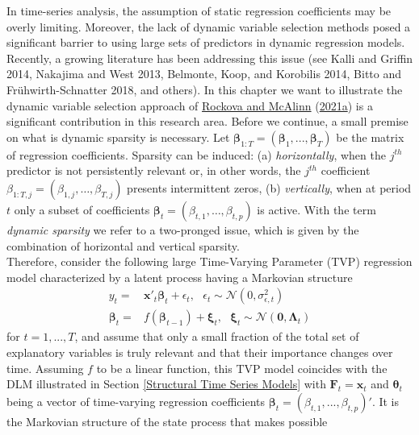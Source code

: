 \documentclass[
  12pt,
]{book}
\theoremstyle{break}
\theoremstyle{nonumberplain}
\begin{document}
In time-series analysis, the assumption of static regression
coefficients may be overly limiting. Moreover, the lack of dynamic
variable selection methods posed a significant barrier to using large
sets of predictors in dynamic regression models. Recently, a growing
literature has been addressing this issue (see Kalli and Griffin 2014,
Nakajima and West 2013, Belmonte, Koop, and Korobilis 2014, Bitto and
Frühwirth-Schnatter 2018, and others). In this chapter we want to
illustrate the dynamic variable selection approach of
\protect\hyperlink{ref-rockova_mcalinn_2021}{Rockova and McAlinn}
(\protect\hyperlink{ref-rockova_mcalinn_2021}{2021a}) is a significant
contribution in this research area. Before we continue, a small premise
on what is dynamic sparsity is necessary. Let
\(\boldsymbol{\beta}_{1:T}=(\boldsymbol{\beta}_{1},...,\boldsymbol{\beta}_{T})\)
be the matrix of regression coefficients. Sparsity can be induced: (a)
\emph{horizontally}, when the \(j^{th}\) predictor is not persistently
relevant or, in other words, the \(j^{th}\) coefficient
\(\beta_{1:T, j}=(\beta_{1,j}, \ldots, \beta_{T,j})\) presents
intermittent zeros, (b) \emph{vertically}, when at period \(t\) only a
subset of coefficients
\(\boldsymbol{\beta}_t=(\beta_{t,1}, \ldots, \beta_{t,p})\) is active.
With the term \emph{dynamic sparsity} we refer to a two-pronged issue,
which is given by the combination of horizontal and vertical sparsity.\\
Therefore, consider the following large Time-Varying Parameter (TVP)
regression model characterized by a latent process having a Markovian
structure \begin{align} \label{eq:eq211}
  y_{t}= & \boldsymbol{x'}_{t}\boldsymbol{\beta}_{t}+\epsilon_{t}, \ \ \ \epsilon_{t}\sim \mathcal{N}(0,\sigma^{2}_{\epsilon,t}) \\
  \boldsymbol{\beta}_{t} = & f( \boldsymbol{\beta}_{t-1})+ \boldsymbol{\xi}_{t}, \ \ \ \boldsymbol{\xi}_{t}\sim \mathcal{N}(\boldsymbol{0},\boldsymbol{\Lambda}_{t}) \nonumber
\end{align} for \(t=1,...,T\), and assume that only a small fraction of
the total set of explanatory variables is truly relevant and that their
importance changes over time. Assuming \(f\) to be a linear function,
this TVP model coincides with the DLM illustrated in Section
\ref{Structural Time Series Models} with
\(\boldsymbol{F}_{t}=\boldsymbol{x}_{t}\) and
\(\boldsymbol{\theta}_{t}\) being a vector of time-varying regression
coefficients \(\boldsymbol{\beta}_{t}=(\beta_{t,1},...,\beta_{t,p})'\).
It is the Markovian structure of the state process that makes possible
\end{document}
